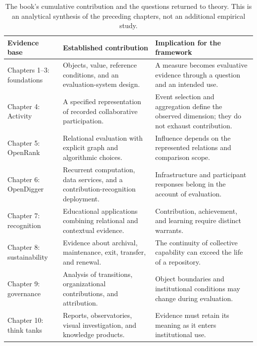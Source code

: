 \begin{table}[tbp]
\caption{The book's cumulative contribution and the questions returned to theory. This is an analytical synthesis of the preceding chapters, not an additional empirical study.}
\label{tab:ch11-evidence}
\centering\small\renewcommand{\arraystretch}{1.18}
\begin{tabularx}{\linewidth}{@{}>{\raggedright\arraybackslash}p{.19\linewidth}>{\raggedright\arraybackslash}X>{\raggedright\arraybackslash}X@{}}
\toprule
\textbf{Evidence base} & \textbf{Established contribution} & \textbf{Implication for the framework}\\\midrule
Chapters 1--3: foundations & Objects, value, reference conditions, and an evaluation-system design. & A measure becomes evaluative evidence through a question and an intended use.\\[3pt]
Chapter 4: Activity & A specified representation of recorded collaborative participation. & Event selection and aggregation define the observed dimension; they do not exhaust contribution.\\[3pt]
Chapter 5: OpenRank & Relational evaluation with explicit graph and algorithmic choices. & Influence depends on the represented relations and comparison scope.\\[3pt]
Chapter 6: OpenDigger & Recurrent computation, data services, and a contribution-recognition deployment. & Infrastructure and participant responses belong in the account of evaluation.\\[3pt]
Chapter 7: recognition & Educational applications combining relational and contextual evidence. & Contribution, achievement, and learning require distinct warrants.\\[3pt]
Chapter 8: sustainability & Evidence about archival, maintenance, exit, transfer, and renewal. & The continuity of collective capability can exceed the life of a repository.\\[3pt]
Chapter 9: governance & Analysis of transitions, organizational contributions, and attribution. & Object boundaries and institutional conditions may change during evaluation.\\[3pt]
Chapter 10: think tanks & Reports, observatories, visual investigation, and knowledge products. & Evidence must retain its meaning as it enters institutional use.\\
\bottomrule
\end{tabularx}
\end{table}

